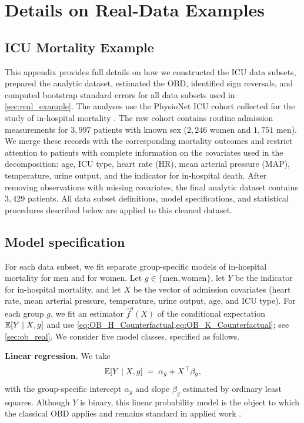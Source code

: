 \section{Details on Real-Data Examples}
\subsection{ICU Mortality Example}
\label{appendix:icu_details}

This appendix provides full details on how we constructed the ICU data subsets, prepared the analytic dataset, estimated the OBD, identified sign reversals, and computed bootstrap standard errors for all data subsets used in \cref{sec:real_example}. The analyses use the PhysioNet ICU cohort collected for the study of in-hospital mortality \citep{goldberger2000physiobank,silva2012predicting,pollard_physionet_2026}. The raw cohort contains routine admission measurements for $3,997$ patients with known sex ($2,246$ women and $1,751$ men). We merge these records with the corresponding mortality outcomes and restrict attention to patients with complete information on the covariates used in the decomposition: age, ICU type, heart rate (HR), mean arterial pressure (MAP), temperature, urine output, and the indicator for in-hospital death. After removing observations with missing covariates, the final analytic dataset contains $3,429$ patients. All data subset definitions, model specifications, and statistical procedures described below are applied to this cleaned dataset.

\subsection*{Model specification}

For each data subset, we fit separate group-specific models of in-hospital mortality for men and for women. Let $g \in \{\text{men}, \text{women}\}$, let $Y$ be the indicator for in-hospital mortality, and let $X$ be the vector of admission covariates (heart rate, mean arterial pressure, temperature, urine output, age, and ICU type). For each group $g$, we fit an estimator $\hat{f}^g(X)$ of the conditional expectation $\mathbb{E}[Y \mid X, g]$ and use \cref{eq:OB_H_Counterfactual,eq:OB_K_Counterfactual}; see \cref{sec:ob_real}. We consider five model classes, specified as follows.

\textbf{Linear regression.} We take
\[
    \mathbb{E}[Y \mid X, g] \;=\; \alpha_{g} + X^{\top}\beta_{g},
\]
with the group-specific intercept $\alpha_{g}$ and slope $\beta_{g}$ estimated by ordinary least squares. Although $Y$ is binary, this linear probability model is the object to which the classical OBD applies and remains standard in applied work \citep{jann2008, edokaChangesCatastrophicHealth2017, sujin_LPM_OB, mweembaGapSelfRatedHealth2023}.

